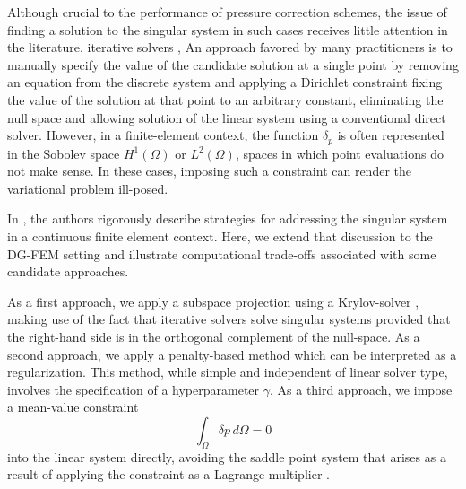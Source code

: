 Although crucial to the performance of pressure correction schemes, the issue of finding a solution to the singular system in such cases receives little attention in the literature. 
iterative solvers \cite{axelsson_iterative_1996,iankov_finite_2013}, 
An approach favored by many practitioners is to manually specify the value of the candidate solution at a single point by removing an equation from the discrete system and applying a Dirichlet constraint fixing the value of the solution at that point to an arbitrary constant, eliminating the null space and allowing solution of the linear system using a conventional direct solver.
However, in a finite-element context, the function $\delta_p$ is often represented in the Sobolev space $H^1(\Omega)$ or $L^2(\Omega)$, spaces in which point evaluations do not make sense. 
In these cases, imposing such a constraint can render the variational problem ill-posed.



In \cite{bochev_finite_2005}, the authors rigorously describe strategies for addressing the singular system in a continuous finite element context. 
Here, we extend that discussion to the DG-FEM setting and illustrate computational trade-offs associated with some candidate approaches.

As a first approach, we apply a subspace projection using a Krylov-solver \cite{vorst_iterative_2003}, making use of the fact that iterative solvers solve singular systems provided that the right-hand side is in the orthogonal complement of the null-space.
As a second approach, we apply a penalty-based method which can be interpreted as a regularization.
This method, while simple and independent of linear solver type, involves the specification of a hyperparameter $\gamma$.
As a third approach, we impose a mean-value constraint 
\begin{equation}
  \int_{\Omega}^{} \delta p \,d\Omega = 0
  \label{eq:mean_value_zero_condition}
\end{equation}
into the linear system directly, avoiding the saddle point system that arises as a result of applying the constraint as a Lagrange multiplier \cite{bochev_finite_2005}.

